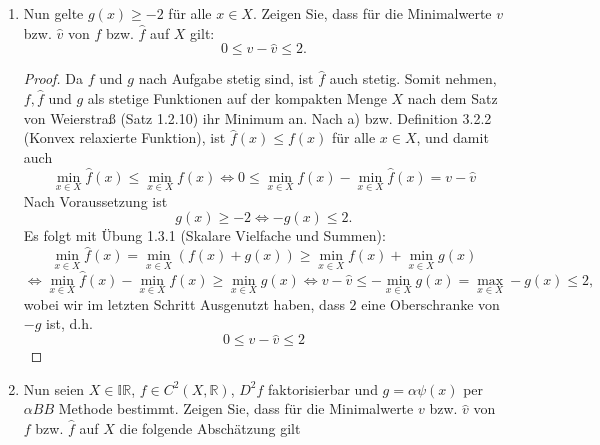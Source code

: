 \documentclass[12pt]{extreport} %
\newcommand{\R}{\mathbb{R}}
\begin{document}
\begin{enumerate}
\begin{proof}
\begin{align*}
			\end{align*} 
			Es gilt außerdem, dass
			$$ \frac{3}{2} x_1^2 \geq f(x) \geq -\frac{1}{2} x_2^2 $$
			für alle $x \in X$, sodass $f(x) \in [-0.5, 1.5]$ und analog $\tilde{g}(x) \in [-0.5, 1.5]$. Somit folgt mit $g \coloneqq g - 1.5$, dass als Verschiebung von $\tilde{g}$ die Funktion $g$ ebenfalls nicht konvex ist, $\hat{f}(x) = f(x) + g(x) = x_1^2 + x_2^2 - 1.5 \leq f(x)$ für alle $x \in X$. Außerdem ist $\hat{f}$ in $C^2(X)$ als Polynom und damit
			$$ D^2 \hat{f} = \begin{pmatrix}
				2 & 0 \\ 0 & 2
			\end{pmatrix} \succ 0 $$
			wodurch $\hat{f}$ nach Satz 2.5.3 ($C^2$-Charakterisierung von Konvexität) konvex ist. Insgesamt erhalten wir eine konvexe Funktion $\hat{f}$ für die $\hat{f}(x) \leq f(x)$ gilt, d.h. $\hat{f}$ ist eine konvexe Relaxierung.
		\end{proof}
	\item Nun gelte $g(x) \geq -2$ für alle $x \in X$. Zeigen Sie, dass für die Minimalwerte $v$ bzw. $\hat{v}$ von $f$ bzw. $\hat{f}$ auf $X$ gilt:
		$$ 0 \leq v - \hat{v} \leq 2. $$
		\begin{proof}
			Da $f$ und $g$ nach Aufgabe stetig sind, ist $\hat{f}$ auch stetig. Somit nehmen, $f, \hat{f}$ und $g$ als stetige Funktionen auf der kompakten Menge $X$ nach dem Satz von Weierstraß (Satz 1.2.10) ihr Minimum an. Nach a) bzw. Definition 3.2.2 (Konvex relaxierte Funktion), ist $\hat{f}(x) \leq f(x)$ für alle $x \in X$, und damit auch 
			$$ \min_{x \in X} \hat{f}(x) \leq \min_{x \in X} f(x) \iff 0 \leq \min_{x \in X} f(x) - \min_{x \in X} \hat{f}(x) = v - \hat{v}  $$
			Nach Voraussetzung ist 
			$$ g(x) \geq -2 \iff -g(x) \leq 2. $$
			 Es folgt mit Übung 1.3.1 (Skalare Vielfache und Summen):
			$$ \min_{x \in X} \hat{f}(x) = \min_{x \in X} \left( f(x) + g(x) \right) \geq \min_{x \in X} f(x) + \min_{x \in X} g(x)$$
			$$ \iff \min_{x \in X} \hat{f}(x) - \min_{x \in X} f(x) \geq \min_{x \in X} g(x) \iff v - \hat{v} \leq  - \min_{x \in X} g(x) = \max_{x \in X} - g(x) \leq 2, $$
			wobei wir im letzten Schritt Ausgenutzt haben, dass $2$ eine Oberschranke von $-g$ ist, d.h. 
			$$ 0 \leq v - \hat{v} \leq 2 $$
		\end{proof}
	\item Nun seien $X \in \mathbb{IR}$, $f \in C^2(X, \R)$, $D^2 f$ faktorisierbar und $g = \alpha \psi(x)$ per $\alpha BB$ Methode bestimmt. Zeigen Sie, dass für die Minimalwerte $v$ bzw. $\hat{v}$ von $f$ bzw. $\hat{f}$ auf $X$ die folgende Abschätzung gilt

\end{enumerate}
\end{document}
